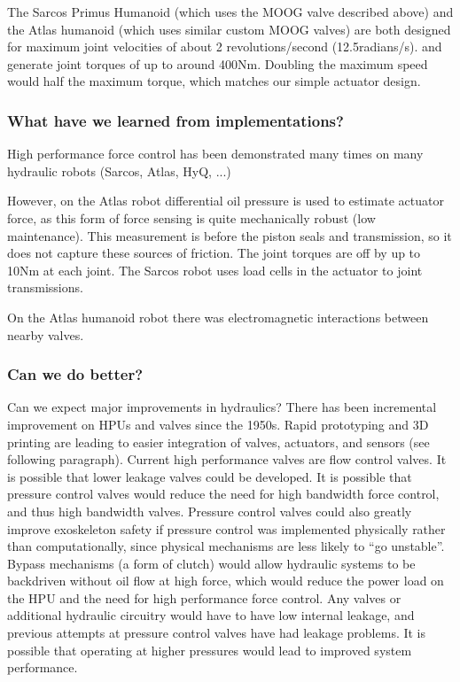 \documentclass[letterpaper,12pt,fullpage]{article}
\begin{document}
The Sarcos Primus Humanoid (which uses the MOOG valve described
above) and the Atlas humanoid (which uses similar custom MOOG valves)
are both designed
for maximum joint velocities of about 2 revolutions/second (12.5radians/s).
and generate joint torques of up to around 400Nm.
Doubling the maximum speed would half the maximum torque, which matches
our simple actuator design.

\subsubsection{What have we learned from implementations?}

High performance force control has been demonstrated many times
on many hydraulic robots (Sarcos, Atlas, HyQ, ...)

However, on the Atlas robot differential oil pressure is used
to estimate actuator force, as this form of force sensing
is quite mechanically robust (low maintenance).
This measurement is before the piston
seals and transmission, so it does not capture these sources
of friction. The joint torques are off by up to 10Nm at each joint.
The Sarcos robot uses load cells in the actuator to joint transmissions.

On the Atlas humanoid robot there was electromagnetic interactions between
nearby valves.

\subsubsection{Can we do better?}

Can we expect major improvements in hydraulics?
There has been incremental improvement on HPUs and valves since
the 1950s. Rapid prototyping and 3D printing are leading to
easier integration of valves, actuators, and sensors (see following
paragraph). Current high performance valves are flow control valves. It
is possible that lower leakage valves could be developed. It is possible
that pressure control valves would reduce the need for high bandwidth
force control, and thus high bandwidth valves. Pressure control valves
could also greatly improve exoskeleton safety if pressure control was
implemented physically rather than computationally, since physical
mechanisms are less likely to ``go unstable''.
Bypass mechanisms (a form of clutch) would allow hydraulic systems
to be backdriven without oil flow at high force, which would reduce
the power load on the HPU and the need for high performance force control.
Any valves or additional hydraulic circuitry
would have to have low internal leakage, and previous attempts at
pressure control valves have had leakage problems.
It is possible that operating at higher pressures would lead to improved
system performance.
\end{document}
